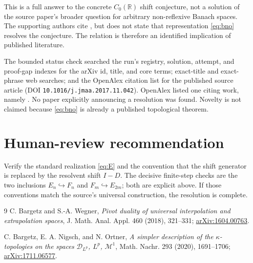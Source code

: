 \documentclass[10pt]{article}
\begin{document}
This is a full answer to the concrete $C_0(\mathbb R)$ shift conjecture, not a
solution of the source paper's broader question for arbitrary non-reflexive
Banach spaces.  The supporting authors cite \cite{BW}, but \cite{BNO} does not
state that representation \eqref{eq:bno} resolves the conjecture.  The
relation is therefore an identified implication of published literature.

The bounded status check searched the run's registry, solution, attempt, and
proof-gap indexes for the arXiv id, title, and core terms; exact-title and
exact-phrase web searches; and the OpenAlex citation list for the published
source article (DOI \texttt{10.1016/j.jmaa.2017.11.042}).  OpenAlex listed one
citing work, namely \cite{BNO}.  No paper explicitly announcing a resolution
was found.  Novelty is not claimed because \eqref{eq:bno} is already a
published topological theorem.

\section*{Human-review recommendation}

Verify the standard realization \eqref{eq:E} and the convention that the
shift generator is replaced by the resolvent shift $I-D$.  The decisive
finite-step checks are the two inclusions
$E_n\hookrightarrow F_n$ and $F_m\hookrightarrow E_{2m}$; both are explicit
above.  If those conventions match the source's universal construction, the
resolution is complete.

\begin{thebibliography}{9}
C. Bargetz and S.-A. Wegner,
\emph{Pivot duality of universal interpolation and extrapolation spaces},
J. Math. Anal. Appl. 460 (2018), 321--331;
\href{https://arxiv.org/abs/1604.00763}{arXiv:1604.00763}.

C. Bargetz, E. A. Nigsch, and N. Ortner,
\emph{A simpler description of the $\kappa$-topologies on the spaces
$\mathcal D_{L^p}$, $L^p$, $\mathcal M^1$},
Math. Nachr. 293 (2020), 1691--1706;
\href{https://arxiv.org/abs/1711.06577}{arXiv:1711.06577}.
\end{thebibliography}
\end{document}

